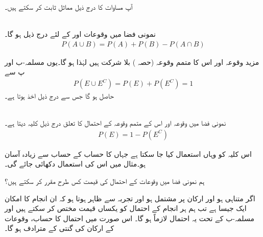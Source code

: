 آپ مساوات  کا درج ذیل مماثل  ثابت کر سکتے ہیں۔

\quad {}\\
نمونی فضا  میں وقوعات  اور  کے لئے درج ذیل ہو گا۔
\begin{align}
P(A\cup B)=P(A)+P(B)-P(A\cap B)
\end{align}

مزید وقوعہ  اور اس کا متمم وقوعہ  (حصہ ) بلا شرکت ہیں لہٰذا  ہو گا۔یوں مسلمہ-ب اور پ سے 
\begin{align*}
P(E\cup E^C)=P(E)+P(E^C)=1
\end{align*}
حاصل ہو گا جس سے درج ذیل اخذ ہوتا ہے۔

\quad {}\\
نمونی فضا  میں وقوعہ  اور اس کے متمم وقوعہ  کے احتمال کا تعلق درج ذیل کلیہ دیتا ہے۔
\begin{align}
P(E)=1-P(E^C)
\end{align}  

اس کلیہ کو وہاں استعمال کیا جا سکتا ہے جہاں  کا حساب  کے حساب سے زیادہ آسان ہو۔مثال  میں اس کی استعمال دکھائی جائے گی۔

ہم نمونی فضا  میں وقوعات کے احتمال کی قیمت کس طرح مقرر کر سکتے ہیں؟

اگر  متناہی ہو اور  ارکان پر مشتمل ہو اور تجربہ سے ظاہر ہوتا ہو کہ ان  انجام کا امکان ایک جیسا ہے تب ہم ہر انجام کے احتمال کو  یکساں قیمت مختص کر سکتے ہیں اور مسلمہ-ب کے تحت یہ احتمال لازماً  ہو گا۔ اس صورت میں احتمال کا حساب، وقوعات کے ارکان کی گنتی کے مترادف ہو گا۔

